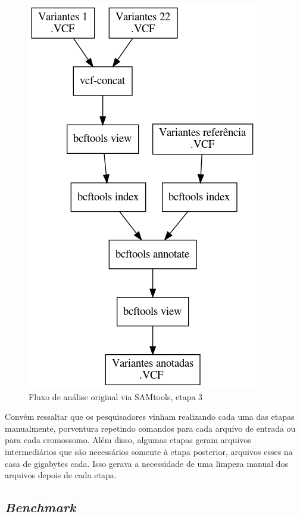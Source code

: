 \documentclass[cic,tc]{iiufrgs}
\begin{document}
{\begin{figure}
  \caption{Fluxo de análise original via SAMtools, etapa 3}
    \begin{center}
      \includegraphics[width=0.85\linewidth]{img/stage3_orig.png}
    \end{center}
    \label{fig:stage3_orig}
\end{figure}

Convém ressaltar que os pesquisadores vinham realizando cada uma das etapas
manualmente, porventura repetindo comandos para cada arquivo de entrada ou para
cada cromossomo. Além disso, algumas etapas geram arquivos intermediários que
são necessários somente à etapa posterior, arquivos esses na casa de gigabytes
cada. Isso gerava a necessidade de uma limpeza manual dos arquivos depois de
cada etapa.

\subsection{\textit{Benchmark}}

}
\end{document}
